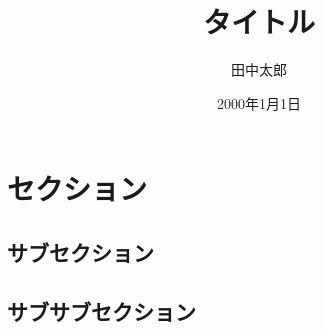 \documentclass[a4paper,10pt]{jsarticle}
\title{タイトル}%
\author{田中太郎}%
\date{2000年1月1日}%
\begin{document}
\maketitle%

\section{セクション}

\subsection{サブセクション}

\subsection{サブサブセクション}
\end{document}
